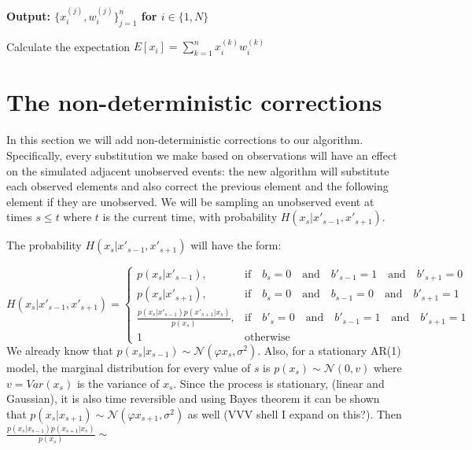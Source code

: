 \documentclass[11pt,a4paper]{article}
\begin{document}
\begin{algorithm}[H]
\begin{algorithmic}
\begin{enumerate}
\end{enumerate}

\State  \bf{Output:} \normalfont $\Big \{ x_{i}^{(j)} , w_{i}^{(j)} \Big \}_{j = 1}^{n}$ for $i \in \{ 1, N \}$

\item Calculate the expectation  $E[x_i] = \sum_{k=1}^{n} x^{(k)}_i w_{i}^{(k)}$
  
 \end{algorithmic}
\end{algorithm}

\section{The non-deterministic corrections}

In this section we will add non-deterministic corrections to our algorithm. Specifically, every substitution we make based on observations will have an effect on the simulated adjacent unobserved events: the new algorithm will substitute each observed elements and also correct the previous element and the following element if they are unobserved. We will be sampling an unobserved event at times $s\leq t$ where $t$ is the current time, with probability $H(x_s|x'_{s-1}, x'_{s+1})$.

The probability $H(x_s|x'_{s-1}, x'_{s+1})$ will have the form:

\[
H(x_s|x'_{s-1}, x'_{s+1}) = \begin{cases} p(x_s|x'_{s-1}), & \mbox{if} \quad b_s = 0  \quad \mbox{and} \quad b'_{s-1} = 1 \quad \mbox{and} \quad b'_{s+1} = 0\\ 
p(x_s|x'_{s+1}), & \mbox{if} \quad b_s = 0  \quad \mbox{and} \quad b_{s-1} = 0 \quad \mbox{and} \quad b'_{s+1} = 1\\
\frac{p(x_s|x'_{s-1})p(x'_{s+1}|x_s)}{p(x_s)}, & \mbox{if} \quad b'_s = 0  \quad \mbox{and} \quad b'_{s-1} = 1 \quad \mbox{and} \quad b'_{s+1} = 1\\
1 & \mbox{otherwise} \end{cases}
\]
We already know that $p(x_s|x_{s-1}) \sim \mathcal{N} (\varphi x_{s}, \sigma^{2})$. Also, for a stationary AR(1) model, the marginal distribution for every value of $s$ is $p(x_{s}) \sim \mathcal{N}(0, v)$ where $v = Var(x_s)$ is the variance of $x_s$. Since the process is stationary, (linear and Gaussian), it is also time reversible and using Bayes theorem it can be shown that $p(x_{s}|x_{s+1}) \sim \mathcal{N} (\varphi x_{s+1}, \sigma^{2})$ as well (VVV shell I expand on this?).
Then $\frac{p(x_s|x_{s-1})p(x_{s+1}|x_s)}{p(x_s)} \sim $
\end{document}
